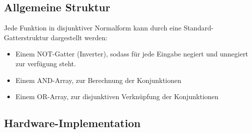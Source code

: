 \documentclass[12pt]{report}
\begin{document}
\subsection{Allgemeine Struktur}
Jede Funktion in disjunktiver Normalform kann durch eine Standard-Gatterstruktur dargestellt werden:
\begin{itemize}
  \item Einem NOT-Gatter (Inverter), sodass für jede Eingabe negiert und unnegiert zur verfügung steht.
  \item Einem AND-Array, zur Berechnung der Konjunktionen
  \item Einem OR-Array, zur disjunktiven Verknüpfung der Konjunktionen
\end{itemize}


\subsection{Hardware-Implementation}
\end{document}
